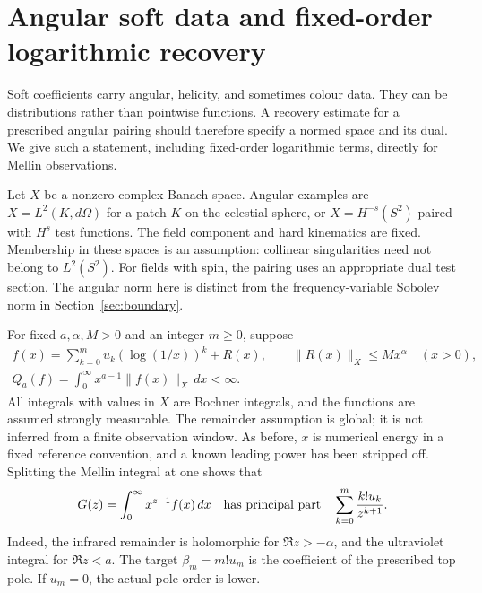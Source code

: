 \section{Angular soft data and fixed-order logarithmic recovery}
\label{sec:angularlogs}
Soft coefficients carry angular, helicity, and sometimes colour data.
They can be distributions rather than pointwise functions. A recovery
estimate for a prescribed angular pairing should therefore specify a
normed space and its dual. We give such a statement, including fixed-order
logarithmic terms, directly for Mellin observations.

Let $X$ be a nonzero complex Banach space. Angular examples are
$X=L^2(K,d\Omega)$ for a patch $K$ on the celestial sphere, or
$X=H^{-s}(S^2)$ paired with $H^s$ test functions. The field component
and hard kinematics are fixed. Membership in these spaces is an
assumption: collinear singularities need not belong to $L^2(S^2)$.
For fields with spin, the pairing uses an appropriate dual test section.
The angular norm here is distinct from the frequency-variable Sobolev
norm in Section~\ref{sec:boundary}.

For fixed $a,\alpha,M>0$ and an integer $m\ge0$, suppose
\begin{equation}\label{eq:vectorclass}
 \begin{gathered}
 f(x)=\sum_{k=0}^m u_k(\log(1/x))^k+R(x),\qquad
 \|R(x)\|_X\le Mx^\alpha\quad(x>0),\\
 Q_a(f)=\int_0^\infty x^{a-1}\|f(x)\|_X\,dx<\infty.
 \end{gathered}
\end{equation}
All integrals with values in $X$ are Bochner integrals, and the
functions are assumed strongly measurable. The remainder assumption
is global; it is not inferred from a finite observation window.
As before, $x$ is numerical energy in a fixed reference convention,
and a known leading power has been stripped off.
Splitting the Mellin integral at one shows that
\[
 G(z)=\int_0^\infty x^{z-1}f(x)\,dx
 \quad\hbox{has principal part}\quad
 \sum_{k=0}^m\frac{k!u_k}{z^{k+1}}.
\]
Indeed, the infrared remainder is holomorphic for $\Re z>-\alpha$,
and the ultraviolet integral for $\Re z<a$.
The target $\beta_m=m!u_m$ is the coefficient of the prescribed top pole.
If $u_m=0$, the actual pole order is lower.

